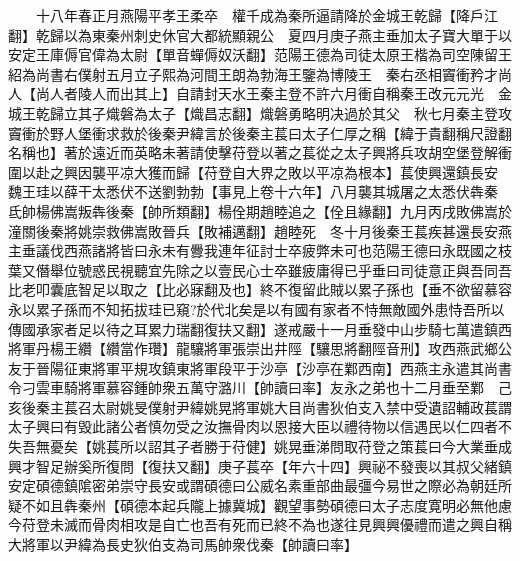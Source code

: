 　　十八年春正月燕陽平孝王柔卒　權千成為秦所逼請降於金城王乾歸【降戶江翻】乾歸以為東秦州刺史休官大都統顯親公　夏四月庚子燕主垂加太子寶大單于以安定王庫傉官偉為太尉【單音蟬傉奴沃翻】范陽王德為司徒太原王楷為司空陳留王紹為尚書右僕射五月立子熙為河間王朗為勃海王鑒為博陵王　秦右丞相竇衝矜才尚人【尚人者陵人而出其上】自請封天水王秦主登不許六月衝自稱秦王改元元光　金城王乾歸立其子熾磐為太子【熾昌志翻】熾磐勇略明决過於其父　秋七月秦主登攻竇衝於野人堡衝求救於後秦尹緯言於後秦主萇曰太子仁厚之稱【緯于貴翻稱尺證翻名稱也】著於遠近而英略未著請使擊苻登以著之萇從之太子興將兵攻胡空堡登解衝圍以赴之興因襲平凉大獲而歸【苻登自大界之敗以平凉為根本】萇使興還鎮長安　魏王珪以薛干太悉伏不送劉勃勃【事見上卷十六年】八月襲其城屠之太悉伏犇秦　氐帥楊佛嵩叛犇後秦【帥所類翻】楊佺期趙睦追之【佺且緣翻】九月丙戌敗佛嵩於潼關後秦將姚崇救佛嵩敗晉兵【敗補邁翻】趙睦死　冬十月後秦王萇疾甚還長安燕主垂議伐西燕諸將皆曰永未有釁我連年征討士卒疲弊未可也范陽王德曰永既國之枝葉又僭舉位號惑民視聽宜先除之以壹民心士卒雖疲庸得已乎垂曰司徒意正與吾同吾比老叩囊底智足以取之【比必寐翻及也】終不復留此賊以累子孫也【垂不欲留慕容永以累子孫而不知拓拔珪已窺?於代北矣是以有國有家者不恃無敵國外患恃吾所以傳國承家者足以待之耳累力瑞翻復扶又翻】遂戒嚴十一月垂發中山步騎七萬遣鎮西將軍丹楊王纘【纘當作瓚】龍驤將軍張崇出井陘【驤思將翻陘音刑】攻西燕武鄉公友于晉陽征東將軍平規攻鎮東將軍段平于沙亭【沙亭在鄴西南】西燕主永遣其尚書令刁雲車騎將軍慕容鍾帥衆五萬守潞川【帥讀曰率】友永之弟也十二月垂至鄴　己亥後秦主萇召太尉姚旻僕射尹緯姚晃將軍姚大目尚書狄伯支入禁中受遺詔輔政萇謂太子興曰有毁此諸公者慎勿受之汝撫骨肉以恩接大臣以禮待物以信遇民以仁四者不失吾無憂矣【姚萇所以詔其子者勝于苻健】姚晃垂涕問取苻登之策萇曰今大業垂成興才智足辦奚所復問【復扶又翻】庚子萇卒【年六十四】興祕不發喪以其叔父緒鎮安定碩德鎮隂密弟崇守長安或謂碩德曰公威名素重部曲最彊今易世之際必為朝廷所疑不如且犇秦州【碩德本起兵隴上據冀城】觀望事勢碩德曰太子志度寛明必無他慮今苻登未滅而骨肉相攻是自亡也吾有死而已終不為也遂往見興興優禮而遣之興自稱大將軍以尹緯為長史狄伯支為司馬帥衆伐秦【帥讀曰率】

